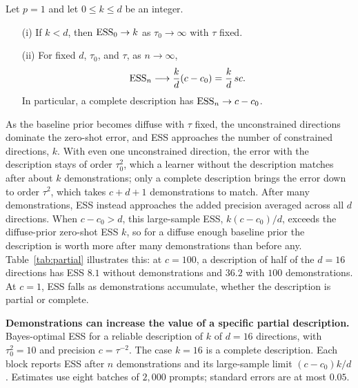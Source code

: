 \begin{proposition}\label{prop:partial}
Let $p=1$ and let $0\le k\le d$ be an integer.
\begin{enumerate}[nosep]
    \item[(i)] If $k<d$, then $\mathrm{ESS}_0\to k$ as $\tau_0\to\infty$ with $\tau$ fixed.
    \item[(ii)] For fixed $d$, $\tau_0$, and $\tau$, as $n\to\infty$,
    \[
    \mathrm{ESS}_n\longrightarrow\frac{k}{d}(c-c_0)
    =\frac{k}{d}\,sc.
    \]
    In particular, a complete description has $\mathrm{ESS}_n\to c-c_0$.
\end{enumerate}
\end{proposition}

As the baseline prior becomes diffuse with $\tau$ fixed, the unconstrained directions dominate the zero-shot error, and ESS approaches the number of constrained directions, $k$. With even one unconstrained direction, the error with the description stays of order $\tau_0^2$, which a learner without the description matches after about $k$ demonstrations; only a complete description brings the error down to order $\tau^2$, which takes $c+d+1$ demonstrations to match. After many demonstrations, ESS instead approaches the added precision averaged across all $d$ directions. When $c-c_0>d$, this large-sample ESS, $k(c-c_0)/d$, exceeds the diffuse-prior zero-shot ESS $k$, so for a diffuse enough baseline prior the description is worth more after many demonstrations than before any. Table~\ref{tab:partial} illustrates this: at $c=100$, a description of half of the $d=16$ directions has ESS $8.1$ without demonstrations and $36.2$ with $100$ demonstrations. At $c=1$, ESS falls as demonstrations accumulate, whether the description is partial or complete.

\begin{table}[t]
\centering\small
\setlength{\tabcolsep}{3pt}
\caption[Demonstrations can increase the value of a specific partial description]{\textbf{Demonstrations can increase the value of a specific partial description.} Bayes-optimal ESS for a reliable description of $k$ of $d=16$ directions, with $\tau_0^2=10$ and precision $c=\tau^{-2}$. The case $k=16$ is a complete description. Each block reports ESS after $n$ demonstrations and its large-sample limit $(c-c_0)k/d$. Estimates use eight batches of $2{,}000$ prompts; standard errors are at most $0.05$.}
\label{tab:partial}
\vspace{3pt}
\end{table}

